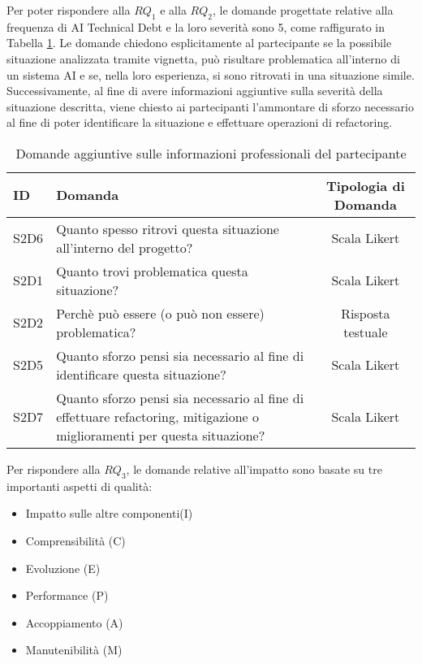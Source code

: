 Per poter rispondere alla $RQ_1$ e alla $RQ_2$, le domande progettate relative alla frequenza di AI Technical Debt e la loro severità sono 5, come raffigurato in Tabella \ref{tab:q_freq_severity}.
Le domande chiedono esplicitamente al partecipante se la possibile situazione analizzata tramite vignetta, può risultare problematica all'interno di un sistema AI e se, nella loro esperienza, si sono ritrovati in una situazione simile.
Successivamente, al fine di avere informazioni aggiuntive sulla severità della situazione descritta, viene chiesto ai partecipanti l'ammontare di sforzo necessario al fine di poter identificare la situazione e effettuare operazioni di refactoring. 
\begin{table}[h]
    \centering
    \begin{tabular}{|l|p{6.8cm}|c|}
        \hline
        \textbf{ID} & \textbf{Domanda} & \textbf{Tipologia di Domanda}\\
        \hline
        S2D6 & Quanto spesso ritrovi questa situazione all'interno del progetto?  & Scala Likert\\
        \hline
        S2D1 & Quanto trovi problematica questa situazione?  & Scala Likert\\
        \hline
        S2D2 & Perchè può essere (o può non essere) problematica?  & Risposta testuale\\
        \hline
        S2D5 & Quanto sforzo pensi sia necessario al fine di identificare questa situazione?  & Scala Likert\\
        \hline
        S2D7 & Quanto sforzo pensi sia necessario al fine di effettuare refactoring, mitigazione o miglioramenti per questa situazione?  & Scala Likert\\
        \hline
    \end{tabular}
    \caption{Domande aggiuntive sulle informazioni professionali del partecipante}
    \label{tab:q_freq_severity}
\end{table}

Per rispondere alla $RQ_3$, le domande relative all'impatto sono basate su tre importanti aspetti di qualità:
\begin{itemize}
    \item Impatto sulle altre componenti(I)
    \item Comprensibilità (C)
    \item Evoluzione (E)
    \item Performance (P)
    \item Accoppiamento (A)
    \item Manutenibilità (M)
\end{itemize}

